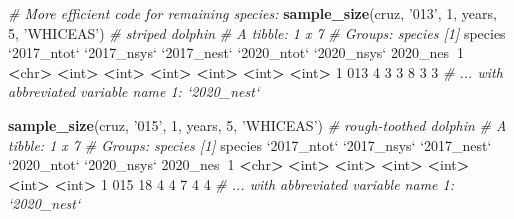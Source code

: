 \documentclass[
]{book}
\newenvironment{Shaded}{\begin{snugshade}}{\end{snugshade}}
\newcommand{\CommentTok}[1]{\textcolor[rgb]{0.56,0.35,0.01}{\textit{#1}}}
\newcommand{\DataTypeTok}[1]{\textcolor[rgb]{0.13,0.29,0.53}{#1}}
\newcommand{\DecValTok}[1]{\textcolor[rgb]{0.00,0.00,0.81}{#1}}
\newcommand{\ErrorTok}[1]{\textcolor[rgb]{0.64,0.00,0.00}{\textbf{#1}}}
\newcommand{\KeywordTok}[1]{\textcolor[rgb]{0.13,0.29,0.53}{\textbf{#1}}}
\newcommand{\NormalTok}[1]{#1}
\newcommand{\OperatorTok}[1]{\textcolor[rgb]{0.81,0.36,0.00}{\textbf{#1}}}
\newcommand{\StringTok}[1]{\textcolor[rgb]{0.31,0.60,0.02}{#1}}
\begin{document}
\begin{Shaded}
\begin{Highlighting}[]
\CommentTok{# More efficient code for remaining species: }
\KeywordTok{sample_size}\NormalTok{(cruz, }\StringTok{'013'}\NormalTok{, }\DecValTok{1}\NormalTok{, years, }\DecValTok{5}\NormalTok{, }\StringTok{'WHICEAS'}\NormalTok{) }\CommentTok{# striped dolphin}
\CommentTok{# A tibble: 1 x 7}
\CommentTok{# Groups:   species [1]}
\NormalTok{  species }\StringTok{`}\DataTypeTok{2017_ntot}\StringTok{`} \StringTok{`}\DataTypeTok{2017_nsys}\StringTok{`} \StringTok{`}\DataTypeTok{2017_nest}\StringTok{`} \StringTok{`}\DataTypeTok{2020_ntot}\StringTok{`} \StringTok{`}\DataTypeTok{2020_nsys}\StringTok{`} \DecValTok{2020}\NormalTok{_nes}\OperatorTok{~}\DecValTok{1}
  \OperatorTok{<}\NormalTok{chr}\OperatorTok{>}\StringTok{         }\ErrorTok{<}\NormalTok{int}\OperatorTok{>}\StringTok{       }\ErrorTok{<}\NormalTok{int}\OperatorTok{>}\StringTok{       }\ErrorTok{<}\NormalTok{int}\OperatorTok{>}\StringTok{       }\ErrorTok{<}\NormalTok{int}\OperatorTok{>}\StringTok{       }\ErrorTok{<}\NormalTok{int}\OperatorTok{>}\StringTok{      }\ErrorTok{<}\NormalTok{int}\OperatorTok{>}
\DecValTok{1} \DecValTok{013}               \DecValTok{4}           \DecValTok{3}           \DecValTok{3}           \DecValTok{8}           \DecValTok{3}          \DecValTok{3}
\CommentTok{# ... with abbreviated variable name 1: `2020_nest`}

\KeywordTok{sample_size}\NormalTok{(cruz, }\StringTok{'015'}\NormalTok{, }\DecValTok{1}\NormalTok{, years, }\DecValTok{5}\NormalTok{, }\StringTok{'WHICEAS'}\NormalTok{) }\CommentTok{# rough-toothed dolphin}
\CommentTok{# A tibble: 1 x 7}
\CommentTok{# Groups:   species [1]}
\NormalTok{  species }\StringTok{`}\DataTypeTok{2017_ntot}\StringTok{`} \StringTok{`}\DataTypeTok{2017_nsys}\StringTok{`} \StringTok{`}\DataTypeTok{2017_nest}\StringTok{`} \StringTok{`}\DataTypeTok{2020_ntot}\StringTok{`} \StringTok{`}\DataTypeTok{2020_nsys}\StringTok{`} \DecValTok{2020}\NormalTok{_nes}\OperatorTok{~}\DecValTok{1}
  \OperatorTok{<}\NormalTok{chr}\OperatorTok{>}\StringTok{         }\ErrorTok{<}\NormalTok{int}\OperatorTok{>}\StringTok{       }\ErrorTok{<}\NormalTok{int}\OperatorTok{>}\StringTok{       }\ErrorTok{<}\NormalTok{int}\OperatorTok{>}\StringTok{       }\ErrorTok{<}\NormalTok{int}\OperatorTok{>}\StringTok{       }\ErrorTok{<}\NormalTok{int}\OperatorTok{>}\StringTok{      }\ErrorTok{<}\NormalTok{int}\OperatorTok{>}
\DecValTok{1} \DecValTok{015}              \DecValTok{18}           \DecValTok{4}           \DecValTok{4}           \DecValTok{7}           \DecValTok{4}          \DecValTok{4}
\CommentTok{# ... with abbreviated variable name 1: `2020_nest`}


\end{Highlighting}
\end{Shaded}
\end{document}

